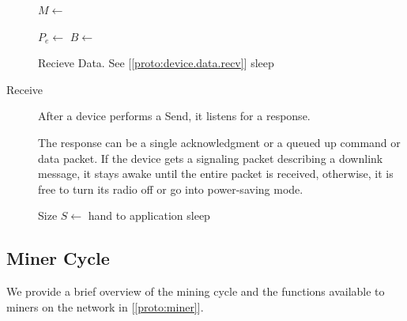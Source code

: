 \documentclass[10pt, nonatbib, nocopyrightspace, reprint]{sigplanconf}
\newenvironment{protocol}[2]{
  \begin{algorithm}[!htb]
    \DontPrintSemicolon
    \caption{#1}\label{#2}
}{
  \end{algorithm}
  \FloatBarrier
}
\newcommand{\protoref}[1]{[\autoref{#1}]}
\begin{document}
\begin{description}
\begin{protocol}{Device Send Data}{proto:device.data.send}
       {
        $M \leftarrow $  \;
         \;
        \BlankLine

        $P_e \leftarrow $  \;
        $B \leftarrow $  \;
         \;
        \BlankLine

         {
           {
            Recieve Data. See \protoref{proto:device.data.recv}
          }
           {sleep}
        }
      }
    \end{protocol}


  \item [Receive] After a device performs a Send, it listens for a response.

    The response can be a single acknowledgment or a queued up command or data packet. If the device gets a signaling packet describing a downlink message, it stays awake until the entire packet is received, otherwise, it is free to turn its radio off or go into power-saving mode.

    \begin{protocol}{Device Receive Data}{proto:device.data.recv}

       {
        Size $S \leftarrow $  \;
         {
           {hand to application}
           {sleep}
        }
      }
    \end{protocol}


\end{description}


\subsection{Miner Cycle}\label{mining}

We provide a brief overview of the mining cycle and the functions available to miners on the network in \protoref{proto:miner}.
\end{document}
